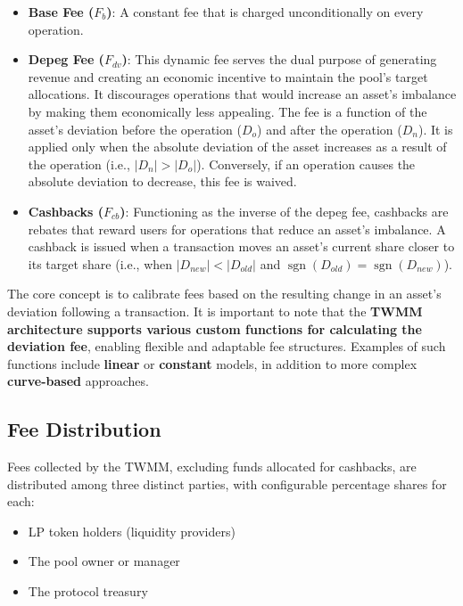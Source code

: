 \begin{itemize}
	\item \textbf{Base Fee ($F_b$)}: A constant fee that is charged unconditionally on every operation.
	
	\item \textbf{Depeg Fee ($F_{dv}$)}: This dynamic fee serves the dual purpose of generating revenue and creating an economic incentive to maintain the pool's target allocations. It discourages operations that would increase an asset's imbalance by making them economically less appealing. The fee is a function of the asset's deviation before the operation ($D_o$) and after the operation ($D_n$). It is applied only when the absolute deviation of the asset increases as a result of the operation (i.e., $ \lvert D_n \rvert > \lvert D_o \rvert$). Conversely, if an operation causes the absolute deviation to decrease, this fee is waived.
	
	\item \textbf{Cashbacks ($F_{cb}$)}: Functioning as the inverse of the depeg fee, cashbacks are rebates that reward users for operations that reduce an asset's imbalance. A cashback is issued when a transaction moves an asset's current share closer to its target share (i.e., when $\lvert D_{new} \rvert < \lvert D_{old} \rvert$ and $\operatorname{sgn}(D_{old}) = \operatorname{sgn}(D_{new})$).
\end{itemize}

The core concept is to calibrate fees based on the resulting change in an asset's deviation following a transaction. It is important to note that the \textbf{TWMM architecture supports various custom functions for calculating the deviation fee}, enabling flexible and adaptable fee structures. Examples of such functions include \textbf{linear} or \textbf{constant} models, in addition to more complex \textbf{curve-based} approaches.

\subsection{Fee Distribution}

Fees collected by the TWMM, excluding funds allocated for cashbacks, are distributed among three distinct parties, with configurable percentage shares for each:
\begin{itemize}
	\item LP token holders (liquidity providers)
	\item The pool owner or manager
	\item The protocol treasury
\end{itemize}

